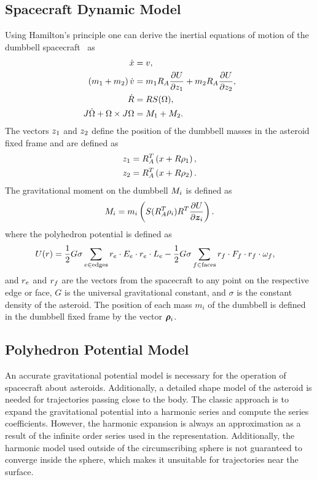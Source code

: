 \documentclass[letterpaper, paper,11pt]{AAS}		%
\begin{document}
\subsection{Spacecraft Dynamic Model}
Using Hamilton's principle one can derive the inertial equations of motion of the dumbbell spacecraft~\cite{kulumani2017b} as
\begin{align}
    \dot{x} &= v, \\
    \left( m_1 + m_2 \right) \dot{v} &= m_1 R_A \frac{\partial U}{\partial z_1} + m_2 R_A \frac{\partial U}{\partial z_2}, \\
    \dot{R} &= R S(\Omega) , \\
    J \dot{\Omega} + \Omega \times J \Omega &= M_1 + M_2.
\end{align}
The vectors \( z_1 \) and \( z_2\) define the position of the dumbbell masses in the asteroid fixed frame and are defined as
\begin{align}
    z_1 &= R_A^T \left( x + R \rho_1 \right) , \\
    z_2 &= R_A^T \left( x + R \rho_2 \right).
\end{align}
The gravitational moment on the dumbbell \( M_i\) is defined as
\begin{align}
    M_i = m_i \left( S(R_A^T \rho_i) R^T \frac{\partial U}{\partial \bm{z}_i} \right).
\end{align}
where the polyhedron potential is defined as 
\begin{align}
    U(r) &= \frac{1}{2} G \sigma \sum_{e \in \text{edges}} r_e \cdot E_e \cdot r_e \cdot L_e - \frac{1}{2}G \sigma \sum_{f \in \text{faces}} r_f \cdot F_f \cdot r_f \cdot \omega_f,
\end{align}
and \( r_e\) and \(r_f \) are the vectors from the spacecraft to any point on the respective edge or face, \( G\) is the universal gravitational constant, and \( \sigma \) is the constant density of the asteroid.
The position of each mass \(m_i\) of the dumbbell is defined in the dumbbell fixed frame by the vector \(\bm{\rho}_i\). 


\subsection{Polyhedron Potential Model}\label{sec:polyhedron_potential}

An accurate gravitational potential model is necessary for the operation of spacecraft about asteroids.
Additionally, a detailed shape model of the asteroid is needed for trajectories passing close to the body.
The classic approach is to expand the gravitational potential into a harmonic series and compute the series coefficients.
However, the harmonic expansion is always an approximation as a result of the infinite order series used in the representation.
Additionally, the harmonic model used outside of the circumscribing sphere is not guaranteed to converge inside the sphere, which makes it unsuitable for trajectories near the surface.
\end{document}
